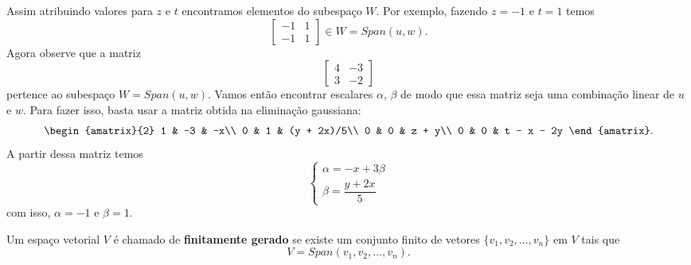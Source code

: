 \begin{exemplos}
\begin{enumerate}
\begin{solucao}
\[            \]
            Assim atribuindo valores para $z$ e $t$ encontramos elementos do subespaço $W$. Por exemplo, fazendo $z = -1$ e $t = 1$ temos
            \[
                \begin{bmatrix}-1 & 1\\-1 & 1 \end{bmatrix} \in W = Span(u, w).
            \]
            Agora observe que a matriz
            \[
                \begin{bmatrix}
                    4 & -3\\
                    3 & -2
                \end{bmatrix}
            \]
            pertence ao subespaço $W = Span(u, w)$. Vamos então encontrar escalares $\alpha$, $\beta$ de modo que essa matriz seja uma combinação linear de $u$ e $w$. Para fazer isso, basta usar a matriz obtida na eliminação gaussiana:
            \[
                \begin{amatrix}{2}
                    1 & -3 & -x\\
                    0 & 1 & (y + 2x)/5\\
                    0 & 0 & z + y\\
                    0 & 0 & t - x - 2y
                \end{amatrix}.
            \]
            A partir dessa matriz temos
            \[
                \begin{cases}
                    \alpha = -x + 3\beta\\
                    \beta = \dfrac{y + 2x}{5}
                \end{cases}
            \]
            com isso, $\alpha = -1$ e $\beta = 1$.
        \end{solucao}

    \end{enumerate}
\end{exemplos}

\begin{definicao}
    Um espaço vetorial $V$ é chamado de \textbf{finitamente gerado} se existe um conjunto finito de vetores $\{v_1, v_2, \dots, v_n\}$ em $V$ tais que
    \[
        V = Span(v_1, v_2, \dots, v_n).
    \]
\end{definicao}


